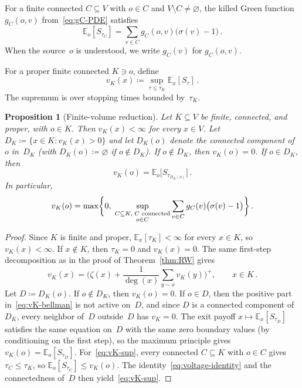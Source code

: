 \documentclass[aop]{imsart}
\theoremstyle{plain}
\newtheorem{proposition}[theorem]{Proposition}
\theoremstyle{definition}
\newcommand{\E}{\mathbb{E}}
\begin{document}
	For a finite connected $C\subseteq V$ with $o\in C$ and $V\setminus C\neq\varnothing$, the killed Green function $g_C(o,v)$ from~\eqref{eq:gC-PDE} satisfies
	\begin{equation}\label{eq:voltage-identity}
		\E_o[S_{\tau_C}]=\sum_{v\in C}g_C(o,v)\bigl(\sigma(v)-1\bigr)\,.
	\end{equation}
	When the source~$o$ is understood, we write $g_C(v)$ for $g_C(o,v)$.
	
	For a proper finite connected $K\ni o$, define
	\[
	v_K(x)\coloneqq\sup_{\tau\leq\tau_K}\E_x[S_\tau]\,.
	\]
	The supremum is over stopping times bounded by~$\tau_K$.
	
	\begin{proposition}[Finite-volume reduction]\label{prop:finite-vol}
		Let $K\subseteq V$ be finite, connected, and proper, with $o\in K$. Then $v_K(x)<\infty$ for every $x\in V$. Let $D_K\coloneqq\{x\in K:v_K(x)>0\}$ and let $D_K(o)$ denote the connected component of~$o$ in~$D_K$ (with $D_K(o)\coloneqq\varnothing$ if $o\notin D_K$). If $o\notin D_K$, then $v_K(o)=0$. If $o\in D_K$, then
		\begin{equation}
			v_K(o)=\E_o\bigl[S_{\tau_{D_K(o)}}\bigr]\,.
		\end{equation}
		In particular,
		\begin{equation}\label{eq:vK-sup}
			v_K(o)=\max\biggl\{0,\;\sup_{\substack{C\subseteq K,\; C\textup{ connected}\\ o\in C}}\sum_{v\in C}g_C(v)\bigl(\sigma(v)-1\bigr)\biggr\}\,.
		\end{equation}
	\end{proposition}
	
	\begin{proof}
		Since $K$ is finite and proper, $\E_x[\tau_K]<\infty$ for every $x\in K$, so $v_K(x)<\infty$. If $x\notin K$, then $\tau_K=0$ and $v_K(x)=0$. The same first-step decomposition as in the proof of Theorem~\ref{thm:RW} gives
		\begin{equation}\label{eq:vK-bellman}
			v_K(x)=\biggl(\zeta(x)+\frac{1}{\deg(x)}\sum_{y\sim x}v_K(y)\biggr)^{\!+},\qquad x\in K\,.
		\end{equation}
		Let $D\coloneqq D_K(o)$. If $o\notin D_K$, then $v_K(o)=0$. If $o\in D$, then the positive part in~\eqref{eq:vK-bellman} is not active on~$D$, and since $D$ is a connected component of~$D_K$, every neighbor of~$D$ outside~$D$ has $v_K=0$. The exit payoff $x\mapsto\E_x[S_{\tau_D}]$ satisfies the same equation on~$D$ with the same zero boundary values (by conditioning on the first step), so the maximum principle gives $v_K(o)=\E_o[S_{\tau_D}]$.	For~\eqref{eq:vK-sup}, every connected $C\subseteq K$ with $o\in C$ gives $\tau_C\leq\tau_K$, so $\E_o[S_{\tau_C}]\leq v_K(o)$. The identity~\eqref{eq:voltage-identity} and the connectedness of~$D$ then yield~\eqref{eq:vK-sup}.
	\end{proof}
	
\end{document}
